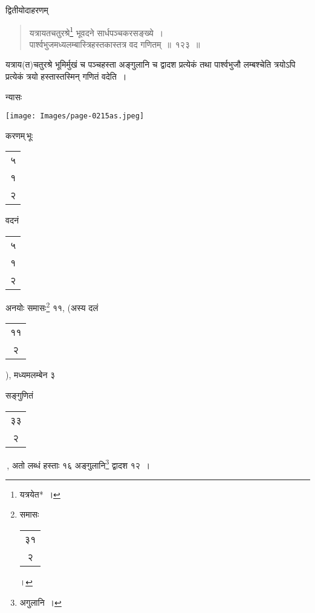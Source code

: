 \documentclass[10pt, openany]{book}
\begin{document}
{{{{{{{{{{{{{{{{{{द्वितीयोदाहरणम्\textendash}

\begin{quote}
{\eg यत्रायतचतुरश्रे\renewcommand{\thefootnote}{१०}\footnote{यत्रयेत*~।} भूवदने सार्धपञ्चकरसङ्ख्ये~। \\
 पार्श्वभुजमध्यलम्बास्त्रिहस्तकास्तत्र वद गणितम्~॥~१२३~॥}\end{quote}

{यत्राय(त)चतुरश्रे भूमिर्मुखं च पञ्चहस्ता अङ्गुलानि च द्वादश
प्रत्येकं तथा पार्श्वभुजौ}
{लम्बश्चेति त्रयोऽपि प्रत्येकं त्रयो हस्तास्तस्मिन् गणितं वदेति~।}

\newpage

{न्यासः\textendash \,}
\vspace{-4mm}

\hspace{20mm} \texttt{[image: Images/page-0215as.jpeg]}
\vspace{1mm}

{करणम्\textendash \,भूः\begin{tabular}
{c}५\\१\\२\end{tabular}वदनं\begin{tabular}
{c}५\\१\\२\end{tabular}अनयोः समासः\renewcommand{\thefootnote}{१}\footnote{समासः\begin{tabular}{c}३१\\२\end{tabular}।} ११, \bigg(अस्य दलं\begin{tabular}
{c}११\\२\end{tabular}\bigg), मध्यमलम्बेन ३}
{सङ्गुणितं \begin{tabular}{|c|} ३३\\२\\\hline \end{tabular}\,, अतो लब्धं हस्ताः १६ अङ्गुलानि\renewcommand{\thefootnote}{२}\footnote{अगुलानि~।} द्वादश १२~।}
\vspace{3mm}

}}}}}}}}}}}}}}}}}
\end{document}
